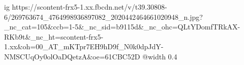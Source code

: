  
 
 
 
 

\ifcmt
  ig https://scontent-frx5-1.xx.fbcdn.net/v/t39.30808-6/269763674_4764998936897082_2020442464661020948_n.jpg?_nc_cat=105&ccb=1-5&_nc_sid=b9115d&_nc_ohc=QLtYDomfTRkAX-RKb9t&_nc_ht=scontent-frx5-1.xx&oh=00_AT_mKTpr7EH9hD9f_N0k0dpJdY-NMSCUqOy0olOaDQetzA&oe=61CBC52D
  @width 0.4
\fi
